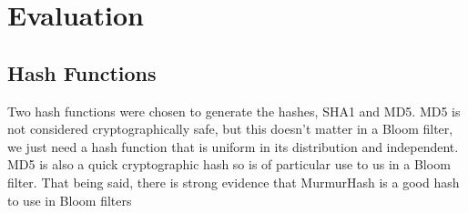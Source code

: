 \chapter{Evaluation}
\label{Evaluation}

\section{Hash Functions}

Two hash functions were chosen to generate the hashes, SHA1 and MD5. MD5 is not considered cryptographically safe, but this doesn't matter in a Bloom filter, we just need a hash function that is uniform in its distribution and independent. MD5 is also a quick cryptographic hash so is of particular use to us in a Bloom filter. That being said, there is strong evidence that MurmurHash is a good hash to use in Bloom filters \cite{MurmurvsCryptoSpeed}